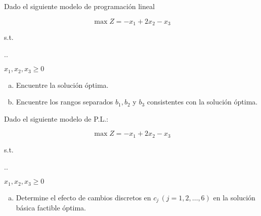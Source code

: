 \documentclass[spanish,letterpaper,11pt]{exam}
\author{Dr. Rafael Torres Escobar}
\begin{document}
\begin{questions}
    \question
    Dado el siguiente modelo de programación lineal

    \[ \max Z = -x_1 + 2x_2 - x_3 \]
  
{\centering
\vspace{2mm}
s.t.
\vspace{2mm}

%
\sysdelim..%

\vspace{3mm}
$x_1, x_2, x_3 \geq 0$
\par}
  
\begin{enumerate}[a)] 
    \item Encuentre la solución óptima.
    \item Encuentre los rangos separados $b_1, b_2 $ y $b_3$ consistentes con la solución óptima.
\end{enumerate}

  
\vspace{6mm}

  \question
  Dado el siguiente modelo de P.L.:

  \[ \max Z = -x_1 + 2x_2 - x_3 \]

  
{\centering
\vspace{2mm}
s.t.
\vspace{2mm}

%
\sysdelim..%

\vspace{3mm}

$x_1,x_2,x_3 \geq 0$
\par}


\begin{enumerate}[a)]
    \item Determine el efecto de cambios discretos en $c_j \, (j = 1,2,\ldots,6)$ en la solución básica factible óptima.
\end{enumerate}

\end{questions}
\end{document}
